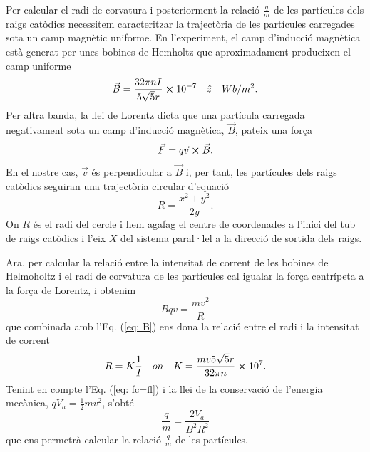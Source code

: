 \documentclass[11pt]{article}
\begin{document}
Per calcular el radi de corvatura i posteriorment la relació $\frac{q}{m}$ de les partícules dels raigs catòdics necessitem caracteritzar la trajectòria de les partícules carregades sota un camp magnètic uniforme. En l'experiment, el camp d'inducció magnètica està generat per unes bobines de Hemholtz que aproximadament produeixen el camp uniforme 
\begin{equation}
    \vec{B}=\frac{32\pi nI}{5\sqrt{5}r}\cross10^{-7} \quad \hat{z}\quad Wb/m^2.
    \label{eq: B}
\end{equation}
Per altra banda, la llei de Lorentz dicta que una partícula carregada negativament sota un camp d'inducció magnètica, $\vec{B}$, pateix una força
\begin{equation}
    \vec{F}=q\vec{v}\cross\vec{B}.
    \label{eq: Lorentz} 
\end{equation} 
En el nostre cas, $\vec{v}$ és perpendicular a $\vec{B }$ i, per tant, les partícules dels raigs catòdics seguiran una trajectòria circular d'equació
\begin{equation}
    R=\frac{x^2+y^2}{2y}.
    \label{eq: radi}
\end{equation}
On $R$ és el radi del cercle i hem agafag el centre de coordenades a l'inici del tub de raigs catòdics i l'eix $X$ del sistema paral·lel a la direcció de sortida dels raigs.

Ara, per calcular la relació entre la intensitat de corrent de les bobines de Helmoholtz i el radi de corvatura de les partícules cal igualar la força centrípeta a la força de Lorentz, i obtenim 
\begin{equation}
    Bqv=\frac{mv^2}{R}
    \label{eq: fc=fl}
\end{equation}
que combinada amb l'Eq. (\ref{eq: B}) ens dona la relació entre el radi i la intensitat de corrent
\begin{equation}
    R=K\frac{1}{I} \quad on \quad K=\frac{mv5\sqrt{5}r}{32\pi n}\cross 10^7.
    \label{eq: IvsR}
\end{equation}
Tenint en compte l'Eq. (\ref{eq: fc=fl}) i la llei de la conservació de l'energia mecànica, $qV_a = \frac{1}{2}mv^2$, s'obté 
\begin{equation}
    \frac{q}{m}=\frac{2V_a }{B^2R^2}
    \label{eq: q/m}
\end{equation}
que ens permetrà calcular la relació $\frac{q}{m}$ de les partícules.
\end{document}
